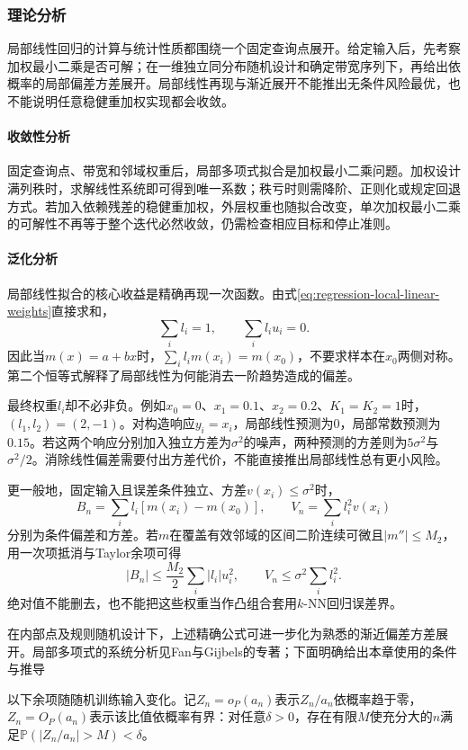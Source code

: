 \subsubsection{理论分析}
\label{sec:regression-loess-theory}

局部线性回归的计算与统计性质都围绕一个固定查询点展开。给定输入后，先考察加权最小二乘是否可解；在一维独立同分布随机设计和确定带宽序列下，再给出依概率的局部偏差方差展开。局部线性再现与渐近展开不能推出无条件风险最优，也不能说明任意稳健重加权实现都会收敛。

\paragraph{收敛性分析}
固定查询点、带宽和邻域权重后，局部多项式拟合是加权最小二乘问题。加权设计满列秩时，求解线性系统即可得到唯一系数；秩亏时则需降阶、正则化或规定回退方式。若加入依赖残差的稳健重加权，外层权重也随拟合改变，单次加权最小二乘的可解性不再等于整个迭代必然收敛，仍需检查相应目标和停止准则。

\paragraph{泛化分析}
局部线性拟合的核心收益是精确再现一次函数。由式\eqref{eq:regression-local-linear-weights}直接求和，
\[
  \sum_i l_i=1,\qquad \sum_i l_i u_i=0.
\]
因此当$m(x)=a+bx$时，$\sum_i l_i m(x_i)=m(x_0)$，不要求样本在$x_0$两侧对称。第二个恒等式解释了局部线性为何能消去一阶趋势造成的偏差。

最终权重$l_i$却不必非负。例如$x_0=0$、$x_1=0.1$、$x_2=0.2$、$K_1=K_2=1$时，$(l_1,l_2)=(2,-1)$。对构造响应$y_i=x_i$，局部线性预测为$0$，局部常数预测为$0.15$。若这两个响应分别加入独立方差为$\sigma^2$的噪声，两种预测的方差则为$5\sigma^2$与$\sigma^2/2$。消除线性偏差需要付出方差代价，不能直接推出局部线性总有更小风险。

更一般地，固定输入且误差条件独立、方差$v(x_i)\leq\sigma^2$时，
\[
  B_n=\sum_i l_i[m(x_i)-m(x_0)],\qquad
  V_n=\sum_i l_i^2v(x_i)
\]
分别为条件偏差和方差。若$m$在覆盖有效邻域的区间二阶连续可微且$|m''|\leq M_2$，用一次项抵消与Taylor余项可得
\[
  |B_n|\leq\frac{M_2}{2}\sum_i|l_i|u_i^2,\qquad
  V_n\leq\sigma^2\sum_i l_i^2.
\]
绝对值不能删去，也不能把这些权重当作凸组合套用$k$-NN回归误差界。

在内部点及规则随机设计下，上述精确公式可进一步化为熟悉的渐近偏差方差展开。局部多项式的系统分析见Fan与Gijbels的专著；下面明确给出本章使用的条件与推导

以下余项随随机训练输入变化。记$Z_n=o_P(a_n)$表示$Z_n/a_n$依概率趋于零，$Z_n=O_P(a_n)$表示该比值依概率有界：对任意$\delta>0$，存在有限$M$使充分大的$n$满足$\mathbb{P}(|Z_n/a_n|>M)<\delta$。

